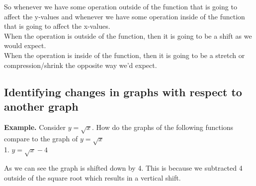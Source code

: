 So whenever we have some operation outside of the function that is going to affect the y-values and whenever we have some operation inside of the function that is going to affect the x-values. \\
When the operation is outside of the function, then it is going to be a shift as we would expect. \\
When the operation is inside of the function, then it is going to be a stretch or compression/shrink the opposite way we'd expect. \\
\subsection{Identifying changes in graphs with respect to another graph}
\textbf{Example.} Consider $y=\sqrt{x}$. How do the graphs of the following functions compare to the graph of $y=\sqrt{x}$  \\

1. $y=\sqrt{x}-4$ \\
As we can see the graph is shifted down by 4. This is because we subtracted 4 outside of the square root which results in a vertical shift. \\

